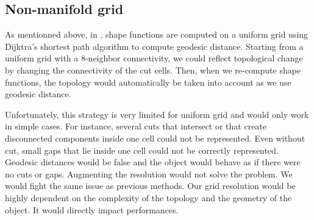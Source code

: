 \documentclass[11pt, oneside, a4paper]{memoir}
\begin{document}

\subsection{Non-manifold grid}

As mentionned above, in \cite{Faure2011}, shape functions are computed on a uniform grid using Dijktra's shortest path algorithm to compute geodesic distance. Starting from a uniform grid with a 8-neighbor connectivity, we could reflect topological change by changing the connectivity of the cut cells. Then, when we re-compute shape functions, the topology would automatically be taken into account as we use geodesic distance. 

Unfortunately, this strategy is very limited for uniform grid and would only work in simple cases. For instance, several cuts that intersect or that create disconnected components inside one cell could not be represented. Even without cut, small gaps that lie inside one cell could not be correctly represented. Geodesic distances would be false and the object would behave as if there were no cuts or gaps. Augmenting the resolution would not solve the problem. We would fight the same issue as previous methods. Our grid resolution would be highly dependent on the complexity of the topology and the geometry of the object. It would directly impact performances.
\end{document}

